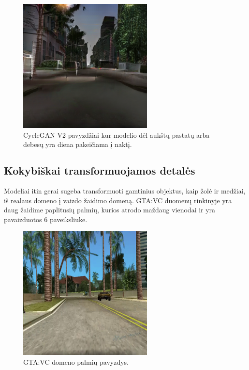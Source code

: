 \documentclass{VUMIFPSbakalaurinis}
\begin{document}
\begin{figure}[H]
            \includegraphics[scale=0.7]{img/debesu_fake}
            \caption{CycleGAN V2 pavyzdžiai kur modelio dėl aukštų pastatų arba debesų yra diena  pakeičiama į naktį.}
            \label{img:mlp}
        \end{figure}
    \subsection{Kokybiškai transformuojamos detalės}
        Modeliai itin gerai sugeba transformuoti gamtinius objektus, kaip žolė ir medžiai, iš realaus domeno į vaizdo žaidimo domeną. GTA:VC duomenų rinkinyje yra daug žaidime paplitusių palmių, kurios atrodo maždaug vienodai ir yra pavaizduotos 6 paveiksliuke.
        \begin{figure}[H]
            \centering
            \includegraphics[scale=0.7]{img/palmiu_pvz}
            \caption{GTA:VC domeno palmių pavyzdys.}
            \label{img:mlp}
        \end{figure}
\end{document}
